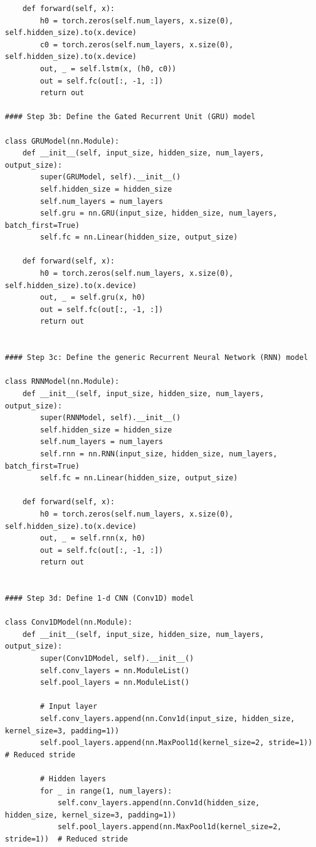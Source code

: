 \documentclass[journal,onecolumn]{IEEEtran}
\begin{document}
{\begin{appendices}
\begin{verbatim}
    def forward(self, x):
        h0 = torch.zeros(self.num_layers, x.size(0), self.hidden_size).to(x.device)
        c0 = torch.zeros(self.num_layers, x.size(0), self.hidden_size).to(x.device)
        out, _ = self.lstm(x, (h0, c0))
        out = self.fc(out[:, -1, :])
        return out

#### Step 3b: Define the Gated Recurrent Unit (GRU) model

class GRUModel(nn.Module):
    def __init__(self, input_size, hidden_size, num_layers, output_size):
        super(GRUModel, self).__init__()
        self.hidden_size = hidden_size
        self.num_layers = num_layers
        self.gru = nn.GRU(input_size, hidden_size, num_layers, batch_first=True)
        self.fc = nn.Linear(hidden_size, output_size)

    def forward(self, x):
        h0 = torch.zeros(self.num_layers, x.size(0), self.hidden_size).to(x.device)
        out, _ = self.gru(x, h0)
        out = self.fc(out[:, -1, :])
        return out


#### Step 3c: Define the generic Recurrent Neural Network (RNN) model

class RNNModel(nn.Module):
    def __init__(self, input_size, hidden_size, num_layers, output_size):
        super(RNNModel, self).__init__()
        self.hidden_size = hidden_size
        self.num_layers = num_layers
        self.rnn = nn.RNN(input_size, hidden_size, num_layers, batch_first=True)
        self.fc = nn.Linear(hidden_size, output_size)

    def forward(self, x):
        h0 = torch.zeros(self.num_layers, x.size(0), self.hidden_size).to(x.device)
        out, _ = self.rnn(x, h0)
        out = self.fc(out[:, -1, :])
        return out


#### Step 3d: Define 1-d CNN (Conv1D) model

class Conv1DModel(nn.Module):
    def __init__(self, input_size, hidden_size, num_layers, output_size):
        super(Conv1DModel, self).__init__()
        self.conv_layers = nn.ModuleList()
        self.pool_layers = nn.ModuleList()

        # Input layer
        self.conv_layers.append(nn.Conv1d(input_size, hidden_size, kernel_size=3, padding=1))
        self.pool_layers.append(nn.MaxPool1d(kernel_size=2, stride=1))  # Reduced stride

        # Hidden layers
        for _ in range(1, num_layers):
            self.conv_layers.append(nn.Conv1d(hidden_size, hidden_size, kernel_size=3, padding=1))
            self.pool_layers.append(nn.MaxPool1d(kernel_size=2, stride=1))  # Reduced stride


\end{verbatim}
\end{appendices}}
\end{document}
